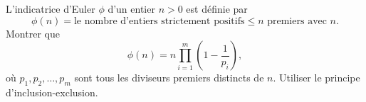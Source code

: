 L'indicatrice d'Euler $\phi$ d'un entier $n > 0$ est définie par
\[ \phi(n) = \text{le nombre d'entiers strictement positifs} \leq n \text{ premiers avec } n. \]
Montrer que
\[ \phi(n) = n\prod_{i=1}^m \left(1 - \frac{1}{p_i}\right), \]
où $p_1, p_2, \ldots, p_m$ sont tous les diviseurs premiers distincts de $n$. Utiliser le principe d'inclusion-exclusion.
